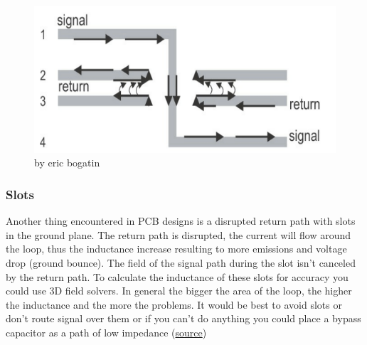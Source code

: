 \documentclass[12pt]{article}
\begin{document}
\begin{figure}[h!]
	\centering
	\includegraphics[width=\textwidth, height=.25\textheight]{assets/change_layer2.png}
	\caption{by eric bogatin}
\end{figure}



\subsubsection{Slots}

Another thing encountered in PCB designs is a disrupted return path with slots in the ground plane. The return path is disrupted, the current will flow around the loop, thus the inductance increase resulting to more emissions and voltage drop (ground bounce). The field of the signal path during the slot isn't canceled by the return path. To calculate the inductance of these slots for accuracy you could use 3D field solvers. In general the bigger the area of the loop, the higher the inductance and the more the problems. It would be best to avoid slots or don't route signal over them or if you can't do anything you could place a bypass capacitor as a path of low impedance (\href{https://electronics.stackexchange.com/questions/81761/whats-radiating-on-my-pcb}{source})
\end{document}
